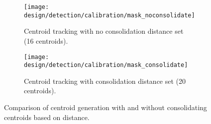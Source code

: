 \begin{figure}[H]
\centering
\begin{subfigure}[b]{0.45\linewidth}
            \centering\texttt{[image: design/detection/calibration/mask\_noconsolidate]}
            \captionsetup{format=hang}
            \caption{Centroid tracking with no consolidation distance set (16 centroids).}
            \label{fig:consolidateA}
  \label{fig:}
    \end{subfigure}
    \begin{subfigure}[b]{0.45\linewidth}
            \centering\texttt{[image: design/detection/calibration/mask\_consolidate]}
            \captionsetup{format=hang}
        \caption{Centroid tracking with consolidation distance set (20 centroids).}
        \label{fig:consolidateB}
      \end{subfigure}
      \captionsetup{format=hang}
    \caption{Comparison of centroid generation with and without consolidating centroids based on distance.}
    \label{fig:centroids_consolidation}
\end{figure}
  
